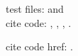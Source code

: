 \documentclass[11pt]{article}
\begin{document}
 test files:  \testC{} and \testV{}\\

 cite code: \plusUn{}, \pluslt{}, \position{}, \plusUntwice{}.

 cite code href: \plusUntwiceHref{}.
\end{document}
